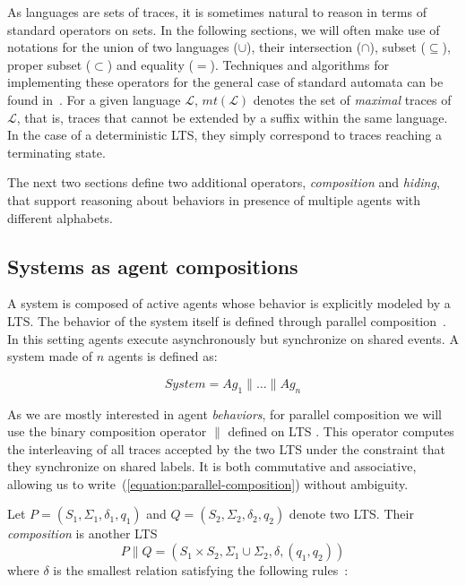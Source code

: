 As languages are sets of traces, it is sometimes natural to reason in terms of standard operators on sets. In the following sections, we will often make use of notations for the union of two languages ($\cup$), their intersection ($\cap$), subset ($\subseteq$), proper subset ($\subset$) and equality ($=$). Techniques and algorithms for implementing these operators for the general case of standard automata can be found in~\cite{Hopcroft:1979, Aho:1986}. For a given language $\mathcal{L}$, $mt(\mathcal{L})$ denotes the set of \emph{maximal} traces of $\mathcal{L}$, that is, traces that cannot be extended by a suffix within the same language. In the case of a deterministic LTS, they simply correspond to traces reaching a terminating state.

The next two sections define two additional operators, \emph{composition} and \emph{hiding}, that support reasoning about behaviors in presence of multiple agents with different alphabets.

\subsection{Systems as agent compositions\label{subsection:lts-composition}}

A system is composed of active agents whose behavior is explicitly modeled by a LTS. The behavior of the system itself is defined through parallel composition~\cite{Hoare:1985}. In this setting agents execute asynchronously but synchronize on shared events. A system made of $n$ agents is defined as:

\begin{equation}
System = Ag_1 \parallel \ldots \parallel Ag_n
\label{equation:parallel-composition}
\end{equation}

As we are mostly interested in agent \emph{behaviors}, for parallel composition we will use the binary composition operator $\parallel$ defined on LTS \cite{Giannakopoulou:1999, Magee:1999}. This operator computes the interleaving of all traces accepted by the two LTS under the constraint that they synchronize on shared labels. It is both commutative and associative, allowing us to write~(\ref{equation:parallel-composition}) without ambiguity. 

Let $P = (S_1,\Sigma_1,\delta_1,q_{1})$ and $Q = (S_2,\Sigma_2,\delta_2,q_{2})$ denote two LTS. Their \emph{composition} is another LTS 
\begin{equation}
P \parallel Q = (S_1 \times S_2,\Sigma_1\cup\Sigma_2,\delta,(q_1,q_2))
\end{equation}
\noindent where $\delta$ is the smallest relation satisfying the following rules~\cite{Giannakopoulou:1999}:

